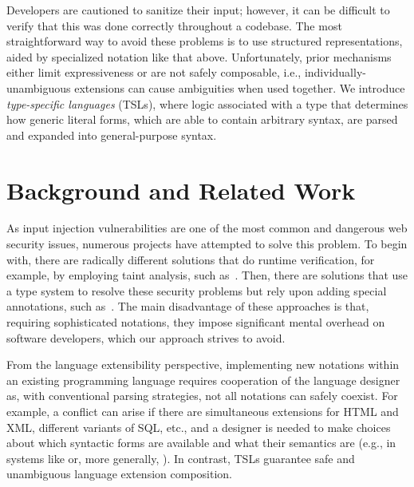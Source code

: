\documentclass{sig-alternate}
\newcommand{\qs}[1]{}%
\begin{document}
Developers are cautioned to sanitize their input; however, it can be difficult to verify that this was done correctly throughout a codebase. The most straightforward way to avoid these problems is to use structured representations, aided by specialized notation like that above. Unfortunately, prior mechanisms either limit expressiveness or are not safely composable, i.e., individually-unambiguous extensions can cause ambiguities when used together. We introduce \emph{type-specific languages} (TSLs), where  logic associated with a type that determines how generic literal forms, which are able to contain arbitrary syntax, are parsed and expanded into general-purpose syntax.

\section{Background and Related Work}
\qs{Describe the specialized (but pertinent) background necessary to appreciate the work. Include references to the literature where appropriate, and briefly explain where your work departs from that done by others.}

As input injection vulnerabilities are one of the most common and dangerous web security issues, numerous projects have attempted to solve this problem. To begin with, there are radically different solutions that do runtime verification, for example, by employing taint analysis, such as~\cite{fortify,PLAS12,livshits13,scriptgard}. Then, there are solutions that use a type system to resolve these security problems but rely upon adding special annotations, such as~\cite{ur/Web,swift,corcoran09selinks}. The main disadvantage of these approaches is that, requiring sophisticated notations, they impose significant mental overhead on software developers, which our approach strives to avoid.

From the language extensibility perspective, implementing new notations within an existing programming language requires cooperation of the language designer as, with conventional parsing strategies, not all notations can safely coexist. For example, a conflict can arise if there are simultaneous extensions for HTML and XML, different variants of SQL, etc., and a designer is needed to make choices about which syntactic forms are available and what their semantics are (e.g., in systems like \cite{Erdweg:2011:SLL:2048147.2048199} or, more generally, \cite{Erdweg:2013:FEL:2517208.2517210}). In contrast, TSLs guarantee safe and unambiguous language extension composition.
\end{document}
